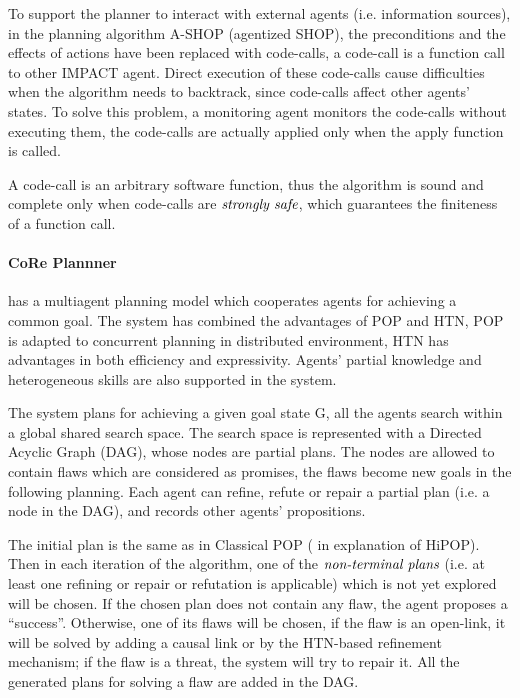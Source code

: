 To support the planner to interact with external agents (i.e. information sources), in the planning algorithm A-SHOP (agentized SHOP), the preconditions and the effects of actions have been replaced with code-calls, a code-call is a function call to other IMPACT agent. Direct execution of these code-calls cause difficulties when the algorithm needs to backtrack, since code-calls affect other agents’ states. To solve this problem, a monitoring agent monitors the code-calls without executing them, the code-calls are actually applied only when the apply function is called.

A code-call is an arbitrary software function, thus the algorithm is sound and complete only when code-calls are $\emph{strongly safe}$, which guarantees the finiteness of a function call.

\paragraph*{CoRe Plannner}
\cite{multi2} has a multiagent planning model which cooperates agents for achieving a common goal. The system has combined the advantages of POP and HTN, POP is adapted to concurrent planning in distributed environment, HTN has advantages in both efficiency and expressivity. Agents’ partial knowledge and heterogeneous skills are also supported in the system.

The system plans for achieving a given goal state G, all the agents search within a global shared search space. The search space is represented with a Directed Acyclic Graph (DAG), whose nodes are partial plans. The nodes are allowed to contain flaws which are considered as promises, the flaws become new goals in the following planning. Each agent can refine, refute or repair a partial plan (i.e. a node in the DAG), and records other agents’ propositions. 

The initial plan is the same as in Classical POP ( in explanation of HiPOP). Then in each iteration of the algorithm, one of the $\emph{non-terminal plans}$ (i.e. at least one refining or repair or refutation is applicable) which is not yet explored will be chosen. If the chosen plan does not contain any flaw, the agent proposes a “success”. Otherwise, one of its flaws will be chosen, if the flaw is an open-link, it will be solved by adding a causal link or by the HTN-based refinement mechanism; if the flaw is a threat, the system will try to repair it. All the generated plans for solving a flaw are added in the DAG.

